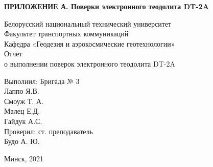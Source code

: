 \documentclass[a4paper]{article}
\begin{document}
\begin{titlepage}
\begin{flushright}
  \large{\textbf{ПРИЛОЖЕНИЕ А. Поверки электронного теодолита DT-2A}}
\end{flushright}
\begin{center}
\large{Белорусский национальный технический университет}\\
\large{Факультет транспортных коммуникаций}\\
\large{Кафедра «Геодезия и аэрокосмические геотехнологии»}\\
\hfill \break
\hfill \break
\hfill \break
\hfill \break
\hfill \break
\hfill \break
\large{Отчет\\
 о выполнении поверок электронного теодолита DT-2A }\\
\hfill \break
\hfill \break
\hfill \break
\hfill \break

\end{center}
\begin{flushright}
  \large{Выполнил: Бригада № 3\\
	Лаппо Я.В.\\
	Смоуж Т. А.\\
	Малец Е.Д.\\
	Гайдук А.С.\\
	\hfill \break
	Проверил: ст. преподаватель\\
	Будо А. Ю.\\}
\end{flushright}
\begin{center}
\hfill \break
\hfill \break
\large{Минск, 2021\\}
\end{center}
\end{titlepage}
\setcounter{page}{14}
\end{document}
